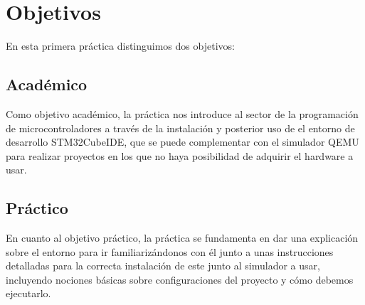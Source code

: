\documentclass[11pt,a4paper]{article}
\begin{document}
	\section{Objetivos}
	\large{
		En esta primera práctica distinguimos dos objetivos:
		
	\subsection{Académico}
		Como objetivo académico, la práctica nos introduce al sector de la programación de microcontroladores a través de la instalación y posterior uso de el entorno de desarrollo STM32CubeIDE, que se puede complementar con el simulador QEMU para realizar proyectos en los que no haya posibilidad de adquirir el hardware a usar.
	\subsection{Práctico}
		En cuanto al objetivo práctico, la práctica se fundamenta en dar una explicación sobre el entorno para ir familiarizándonos con él junto a unas instrucciones detalladas para la correcta instalación de este junto al simulador a usar, incluyendo nociones básicas sobre configuraciones del proyecto y cómo debemos ejecutarlo.
	}
	
\end{document}
